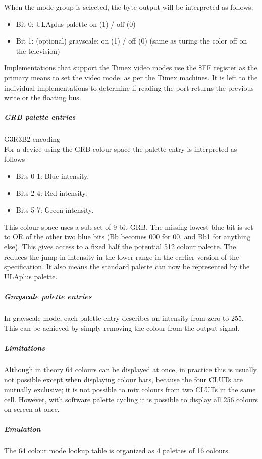When the mode group is selected, the byte output will be interpreted
as follows:
\begin{itemize}
\item[] Bit 0: ULAplus palette on (1) / off (0)
\item[] Bit 1: (optional) grayscale: on (1) / off (0) (same as turing
  the color off on the television)
\end{itemize}

Implementations that support the Timex video modes use the \$FF
register as the primary means to set the video mode, as per the Timex
machines. It is left to the individual implementations to determine if
reading the port returns the previous write or the floating bus.

\subparagraph{GRB palette entries}

G3R3B2 encoding\\
For a device using the GRB colour space the palette entry is
interpreted as follows
\begin{itemize}
\item[] Bits 0-1: Blue intensity.
\item[] Bits 2-4: Red intensity.
\item[] Bits 5-7: Green intensity.
\end{itemize}

This colour space uses a sub-set of 9-bit GRB. The missing lowest blue
bit is set to OR of the other two blue bits (Bb becomes 000 for 00,
and Bb1 for anything else). This gives access to a fixed half the
potential 512 colour palette. The reduces the jump in intensity in the
lower range in the earlier version of the specification. It also means
the standard palette can now be represented by the ULAplus palette.

\subparagraph{Grayscale palette entries}
In grayscale mode, each palette entry describes an intensity from zero
to 255. This can be achieved by simply removing the colour from the
output signal.

\subparagraph{Limitations}
Although in theory 64 colours can be displayed at once, in practice
this is usually not possible except when displaying colour bars,
because the four CLUTs are mutually exclusive; it is not possible to
mix colours from two CLUTs in the same cell. However, with software
palette cycling it is possible to display all 256 colours on screen at
once.

\subparagraph{Emulation}
The 64 colour mode lookup table is organized as 4 palettes of 16
colours.

